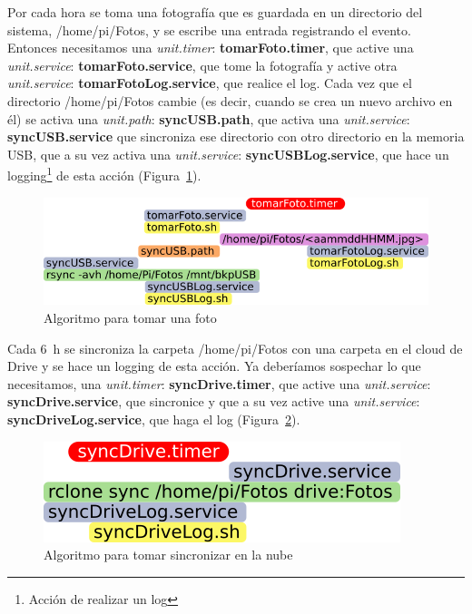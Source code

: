 \documentclass[10pt,a4paper]{article}
\begin{document}
Por cada hora se toma una fotograf\'ia que es guardada en un directorio del sistema, /home/pi/Fotos, y se escribe una entrada registrando el evento. Entonces necesitamos una \emph{unit.timer}: \textbf{tomarFoto.timer}, que active una \emph{unit.service}: \textbf{tomarFoto.service}, que tome la fotograf\'ia y active otra \emph{unit.service}: \textbf{tomarFotoLog.service}, que realice el log. Cada vez que el directorio /home/pi/Fotos cambie (es decir, cuando se crea un nuevo archivo en \'el) se activa una \emph{unit.path}: \textbf{syncUSB.path}, que activa una \emph{unit.service}: \textbf{syncUSB.service} que sincroniza ese directorio con otro directorio en la memoria USB, que a su vez activa una \emph{unit.service}: \textbf{syncUSBLog.service}, que hace un logging\footnote{Acci\'on de realizar un log} de esta acci\'on (Figura~\ref{fig:tomarFoto}).\\

\begin{figure}[h!]
\centering
    \includegraphics[scale=0.25]{pictos/tomarFoto.png}
    \caption{Algoritmo para tomar una foto}
    \label{fig:tomarFoto}
\end{figure}

Cada \SI{6}{h} se sincroniza la carpeta /home/pi/Fotos con una carpeta en el cloud de Drive y se hace un logging de esta acci\'on. Ya deber\'iamos sospechar lo que necesitamos, una \emph{unit.timer}: \textbf{syncDrive.timer}, que active una \emph{unit.service}: \textbf{syncDrive.service}, que sincronice y que a su vez active una \emph{unit.service}: \textbf{syncDriveLog.service}, que haga el log (Figura~\ref{fig:syncDrive}).\\

\begin{figure}[h!]
\centering
    \includegraphics[scale=0.25]{pictos/syncDriver.png}
    \caption{Algoritmo para tomar sincronizar en la nube}
    \label{fig:syncDrive}
\end{figure}
\end{document}
